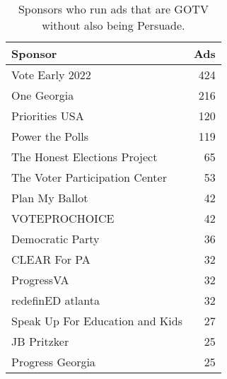 \begin{table}[ht]
\centering
\begin{tabular}{lr}
  \hline
Sponsor & Ads \\ 
  \hline
Vote Early 2022 & 424 \\ 
  One Georgia & 216 \\ 
  Priorities USA & 120 \\ 
  Power the Polls & 119 \\ 
  The Honest Elections Project &  65 \\ 
  The Voter Participation Center &  53 \\ 
  Plan My Ballot &  42 \\ 
  VOTEPROCHOICE &  42 \\ 
  Democratic Party &  36 \\ 
  CLEAR For PA &  32 \\ 
  ProgressVA &  32 \\ 
  redefinED atlanta &  32 \\ 
  Speak Up For Education and Kids &  27 \\ 
  JB Pritzker &  25 \\ 
  Progress Georgia &  25 \\ 
   \hline
\end{tabular}
\caption{Sponsors who run ads that are GOTV without also being Persuade.} 
\label{tab:non_persuade_gotv_sponsors}
\end{table}

